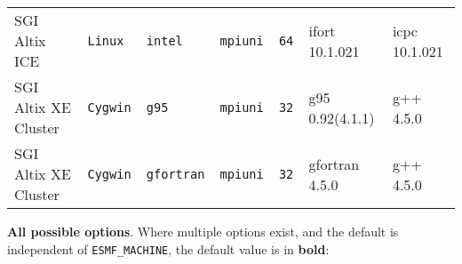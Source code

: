 \begin{tabular}{lllllll}
SGI Altix ICE         &\tt Linux  &\tt intel        &\tt mpiuni     &\tt 64              & ifort \footnotesize 10.1.021       & icpc \footnotesize 10.1.021     \\ %
SGI Altix XE Cluster  &\tt Cygwin &\tt g95          &\tt mpiuni     &\tt 32              & g95 \footnotesize 0.92(4.1.1)      & g++  \footnotesize 4.5.0        \\ %
SGI Altix XE Cluster  &\tt Cygwin &\tt gfortran     &\tt mpiuni     &\tt 32              & gfortran \footnotesize 4.5.0       & g++  \footnotesize 4.5.0        \\ %
\end{tabular}

\vspace{1ex}

{\bf All possible options}. Where multiple options exist, and the default is independent
of {\tt ESMF\_MACHINE}, the default value is in {\bf bold}:

\vspace{1ex}


